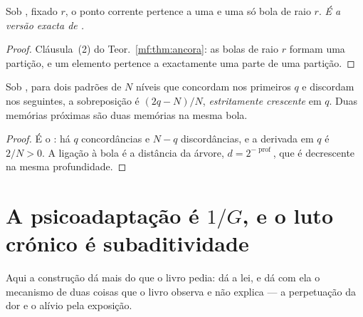 \documentclass[../livro.tex]{subfiles}
\begin{document}
\begin{corolario}\label{mf:cor:umsotem}
Sob , fixado $r$, o ponto corrente pertence a uma e uma só bola de raio
$r$. \emph{É a versão exacta de .}
\end{corolario}

\begin{proof}
Cláusula~(2) do Teor.~\ref{mf:thm:ancora}: as bolas de raio $r$ formam uma
partição, e um elemento pertence a exactamente uma parte de uma partição.
\end{proof}

\begin{corolario}\label{mf:cor:prox}
Sob , para dois padrões de $N$ níveis que concordam nos primeiros $q$ e
discordam nos seguintes, a sobreposição é $(2q-N)/N$, \emph{estritamente
crescente} em $q$. Duas memórias próximas são duas memórias na mesma bola.
\end{corolario}

\begin{proof}
É o : há $q$ concordâncias e $N-q$ discordâncias, e a derivada em $q$ é
$2/N>0$. A ligação à bola é a distância da árvore, $d=2^{-\operatorname{prof}}$,
que é decrescente na mesma profundidade.
\end{proof}


\section{A psicoadaptação é $1/G$, e o luto crónico é subaditividade}\label{mf:adapta}

\noindent Aqui a construção dá mais do que o livro pedia: dá a lei, e dá com ela
o mecanismo de duas coisas que o livro observa e não explica --- a perpetuação da
dor e o alívio pela exposição.
\end{document}
